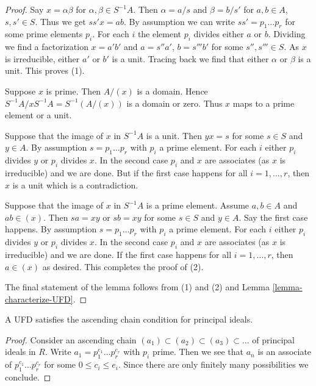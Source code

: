 \begin{proof}
Say $x = \alpha \beta$ for $\alpha, \beta \in S^{-1}A$. Then
$\alpha = a/s$ and $\beta = b/s'$ for $a, b \in A$, $s, s' \in S$.
Thus we get $ss'x = ab$. By assumption we can write
$ss' = p_1 \ldots p_r$ for some prime elements $p_i$.
For each $i$ the element $p_i$ divides either $a$ or $b$.
Dividing we find a factorization $x = a' b'$ and
$a = s'' a'$, $b = s''' b'$ for some $s'', s''' \in S$.
As $x$ is irreducible, either $a'$ or $b'$ is a unit.
Tracing back we find that either $\alpha$ or $\beta$ is a unit.
This proves (1).

\medskip\noindent
Suppose $x$ is prime. Then $A/(x)$ is a domain. Hence
$S^{-1}A/xS^{-1}A = S^{-1}(A/(x))$ is a domain or zero.
Thus $x$ maps to a prime element or a unit.

\medskip\noindent
Suppose that the image of $x$ in $S^{-1}A$ is a unit.
Then $y x = s$ for some $s \in S$ and $y \in A$. By assumption
$s = p_1 \ldots p_r$ with $p_i$ a prime element. For each $i$ either
$p_i$ divides $y$ or $p_i$ divides $x$. In the second case
$p_i$ and $x$ are associates (as $x$ is irreducible) and we are done.
But if the first case happens for all $i = 1, \ldots, r$, then
$x$ is a unit which is a contradiction.

\medskip\noindent
Suppose that the image of $x$ in $S^{-1}A$ is a prime element.
Assume $a, b \in A$ and $ab \in (x)$. Then $sa = xy$ or
$sb = xy$ for some $s \in S$ and $y \in A$. Say the first
case happens. By assumption
$s = p_1 \ldots p_r$ with $p_i$ a prime element. For each $i$ either
$p_i$ divides $y$ or $p_i$ divides $x$. In the second case
$p_i$ and $x$ are associates (as $x$ is irreducible) and we are done.
If the first case happens for all $i = 1, \ldots, r$, then
$a \in (x)$ as desired. This completes the proof of (2).

\medskip\noindent
The final statement of the lemma follows from (1) and (2)
and Lemma \ref{lemma-characterize-UFD}.
\end{proof}

\begin{lemma}
\label{lemma-UFD-ascending-chain-condition-principal-ideals}
A UFD satisfies the ascending chain condition for principal
ideals.
\end{lemma}

\begin{proof}
Consider an ascending chain $(a_1) \subset (a_2) \subset (a_3) \subset \ldots$
of principal ideals in $R$. Write $a_1 = p_1^{e_1} \ldots p_r^{e_r}$
with $p_i$ prime. Then we see that $a_n$ is an associate of
$p_1^{c_1} \ldots p_r^{c_r}$ for some $0 \leq c_i \leq e_i$.
Since there are only finitely many possibilities we conclude.
\end{proof}


